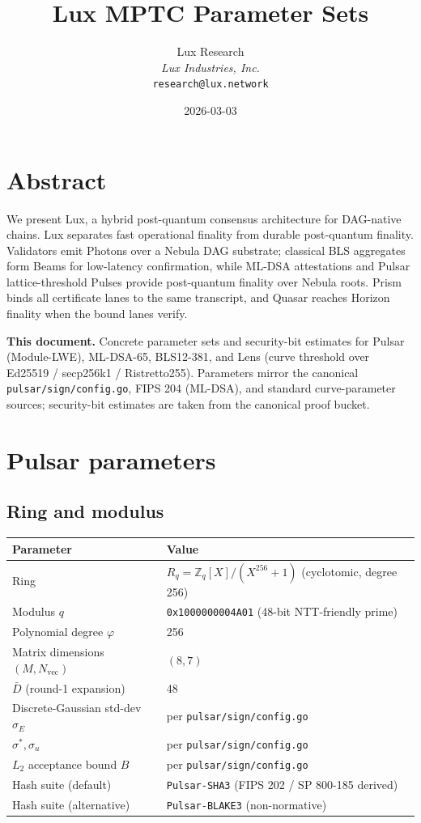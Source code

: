 \documentclass[11pt,a4paper]{article}
\title{Lux MPTC Parameter Sets}
\author{
Lux Research\\
\textit{Lux Industries, Inc.}\\
\texttt{research@lux.network}
}
\date{2026-03-03}
\begin{document}
\luxcoverpage

\section*{Abstract}

\noindent We present Lux, a hybrid post-quantum consensus architecture for DAG-native chains. Lux separates fast operational finality from durable post-quantum finality. Validators emit Photons over a Nebula DAG substrate; classical BLS aggregates form Beams for low-latency confirmation, while ML-DSA attestations and Pulsar lattice-threshold Pulses provide post-quantum finality over Nebula roots. Prism binds all certificate lanes to the same transcript, and Quasar reaches Horizon finality when the bound lanes verify.

\textbf{This document.} Concrete parameter sets and security-bit estimates for Pulsar (Module-LWE), ML-DSA-65, BLS12-381, and Lens (curve threshold over Ed25519 / secp256k1 / Ristretto255). Parameters mirror the canonical \texttt{pulsar/sign/config.go}, FIPS 204 (ML-DSA), and standard curve-parameter sources; security-bit estimates are taken from the canonical proof bucket.

\section{Pulsar parameters}

\subsection{Ring and modulus}

\begin{tabular}{@{}p{}p{}@{}}
  \toprule
  \textbf{Parameter} & \textbf{Value} \\
  \midrule
  Ring & $R_q = \mathbb{Z}_q[X]/(X^{256}+1)$ (cyclotomic, degree 256) \\
  Modulus $q$ & \texttt{0x1000000004A01} (48-bit NTT-friendly prime) \\
  Polynomial degree $\varphi$ & 256 \\
  Matrix dimensions $(M, N_{\mathrm{vec}})$ & $(8, 7)$ \\
  $\bar{D}$ (round-1 expansion) & 48 \\
  Discrete-Gaussian std-dev $\sigma_E$ & per \texttt{pulsar/sign/config.go} \\
  $\sigma^*, \sigma_u$ & per \texttt{pulsar/sign/config.go} \\
  $L_2$ acceptance bound $B$ & per \texttt{pulsar/sign/config.go} \\
  Hash suite (default) & \texttt{Pulsar-SHA3} (FIPS 202 / SP 800-185 derived) \\
  Hash suite (alternative) & \texttt{Pulsar-BLAKE3} (non-normative) \\
  \bottomrule
\end{tabular}
\end{document}
